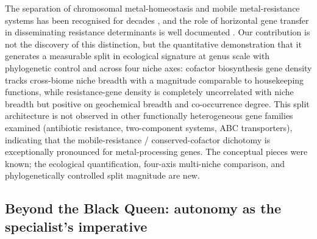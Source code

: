 \documentclass[times]{zHenriquesLab-StyleBioRxiv}
\begin{document}
The separation of chromosomal metal-homeostasis and mobile metal-resistance
systems has been recognised for decades \cite{silver1998,nies2000}, and the role
of horizontal gene transfer in disseminating resistance determinants is well
documented \cite{coombs2004,staehlin2016,rozycki2009,hemme2016,liebert1999,bouzat2013}. Our contribution
is not the discovery of this distinction, but the quantitative demonstration that
it generates a measurable split in ecological signature at genus scale with
phylogenetic control and across four niche axes: cofactor biosynthesis gene
density tracks cross-biome niche breadth with a magnitude comparable to
housekeeping functions, while resistance-gene density is completely uncorrelated
with niche breadth but positive on geochemical breadth and co-occurrence degree.
This split architecture is not observed in other functionally heterogeneous gene
families examined (antibiotic resistance, two-component systems, ABC
transporters), indicating that the mobile-resistance / conserved-cofactor
dichotomy is exceptionally pronounced for metal-processing genes. The conceptual
pieces were known; the ecological quantification, four-axis multi-niche
comparison, and phylogenetically controlled split magnitude are new.


\subsection{Beyond the Black Queen: autonomy as the specialist's imperative}
\end{document}
